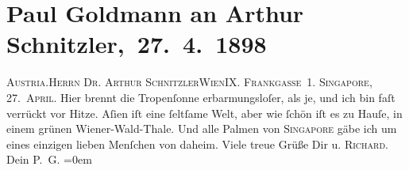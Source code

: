 

         
         \renewcommand{\erwaehntePersonen}{Personen: Richard Beer-Hofmann, Paul Goldmann}
         \renewcommand{\erwaehnteOrte}{Orte: Asien, Frankgasse, Singapur, Wien, Wienerwald, Österreich}
         \renewcommand{\erwaehnteWerke}{}
               \section[ Paul Goldmann an Arthur Schnitzler, 27. 4. 1898]{ Paul Goldmann an Arthur Schnitzler, 27. 4. 1898}\nopagebreak{}\rehead{ }\begin{ledgroupsized}[t]{13cm}\normalsize\beginnumbering{} \toendnotes[C]{\smallbreak\pagebreak[2]} 
\pstart{}{\pb}\textsc{Austria}.\pend{}\pstart{}\textsc{Herrn Dr. Arthur Schnitzler}\pend{}\pstart{}\textsc{Wien}\pend{}\pstart{}\textsc{IX. Frankgaſse 1}.\pend{}{\bigskip}\pstart
           {\pb}\textsc{Singapore}, 27. \textsc{April}.\pend
           \pstart
           Hier brennt die Tropenſonne erbarmungsloſer, als je, und ich bin faſt verrückt vor
               Hitze. Aſien iſt eine ſeltſame Welt, aber wie
               ſchön iſt es zu Hauſe, in einem grünen Wiener-Wald-Thale. Und alle Palmen von \textsc{Singapore} gäbe ich um eines einzigen lieben Menſchen von daheim.\pend
           \pstart
           Viele treue Grüße Dir u. \textsc{Richard}.{\\[\baselineskip]}Dein \spacefill\mbox{P. G.}\pend
           \leftskip=0em{}
         
         \endnumbering{}\end{ledgroupsized}  \newcommand{\dateiname}{L02851}\newcommand{\titel}{Paul Goldmann an Arthur Schnitzler, 27. 4. 1898}\newcommand{\editorInnen}{Martin Anton Müller und Laura Untner}
      